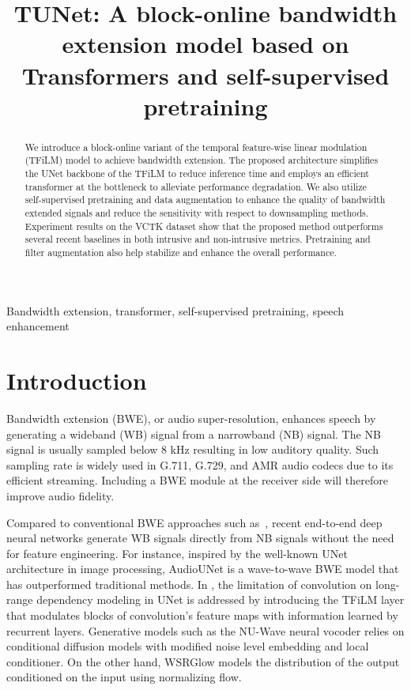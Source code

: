 \documentclass{article}
\title{TUNet: A block-online bandwidth extension model based on Transformers and self-supervised pretraining}
\begin{document}
\maketitle


\begin{abstract}
We introduce a block-online variant of the temporal feature-wise linear modulation (TFiLM) model to achieve bandwidth extension. The proposed architecture simplifies the UNet backbone of the TFiLM to reduce inference time and employs an efficient transformer at the bottleneck to alleviate performance degradation. We also utilize self-supervised pretraining and data augmentation to enhance the quality of bandwidth extended signals and reduce the sensitivity with respect to downsampling methods. Experiment results on the VCTK dataset show that the proposed method outperforms several recent baselines in both intrusive and non-intrusive metrics. Pretraining and filter augmentation also help stabilize and enhance the overall performance.
\end{abstract}
\begin{keywords}
Bandwidth extension, transformer, self-supervised pretraining, speech enhancement
\end{keywords}
\vspace{-0.2cm}
\section{Introduction}
\vspace{-0.1cm}
\label{sec:intro}
Bandwidth extension (BWE), or audio super-resolution, enhances speech by generating a wideband (WB) signal from a narrowband (NB) signal. The NB signal is usually sampled below 8 kHz resulting in low auditory quality. Such sampling rate is widely used in G.711, G.729, and AMR audio codecs due to its efficient streaming. Including a BWE module at the receiver side will therefore improve audio fidelity.

Compared to conventional BWE approaches such as~\cite{codebook, gmm2, hmm}, recent end-to-end deep neural networks generate WB signals directly from NB signals without the need for feature engineering. For instance, inspired by the well-known UNet architecture \cite{ronneberger2015unet} in image processing, AudioUNet \cite{waveunet} is a wave-to-wave BWE model that has outperformed traditional methods. In \cite{birnbaum2021temporal}, the limitation of convolution on long-range dependency modeling in UNet is addressed by introducing the TFiLM layer that modulates blocks of convolution's feature maps with information learned by recurrent layers. Generative models such as the NU-Wave \cite{nuwave} neural vocoder relies on conditional diffusion models with modified noise level embedding and local conditioner. On the other hand, WSRGlow \cite{wsrglow} models the distribution of the output conditioned on the input using normalizing flow.
\end{document}
